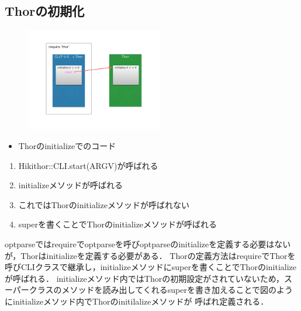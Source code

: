 
\subsection{Thorの初期化}
\begin{figure}[htbp]\begin{center}
\includegraphics[width=6cm,bb=0 0 442 432]{../figs/./hikiutils_yamane_09_copy.003.jpg}
\caption{}
\label{default}\end{center}\end{figure}
\begin{itemize}
\item Thorのinitializeでのコード
\end{itemize}
\begin{enumerate}
\item Hikithor::CLI.start(ARGV)が呼ばれる
\item initializeメソッドが呼ばれる
\item これではThorのinitializeメソッドが呼ばれない
\item superを書くことでThorのinitializeメソッドが呼ばれる
\end{enumerate}
optparseではrequireでoptparseを呼びoptparseのinitializeを定義する必要はないが，Thorはinitializeを定義する必要がある．
Thorの定義方法はrequireでThorを呼びCLIクラスで継承し，initializeメソッドにsuperを書くことでThorのinitializeが呼ばれる．
initializeメソッド内ではThorの初期設定がされていないため，スーパークラスのメソッドを読み出してくれるsuperを書き加えることで図のようにinitializeメソッド内でThorのinitilalizeメソッドが
呼ばれ定義される．

